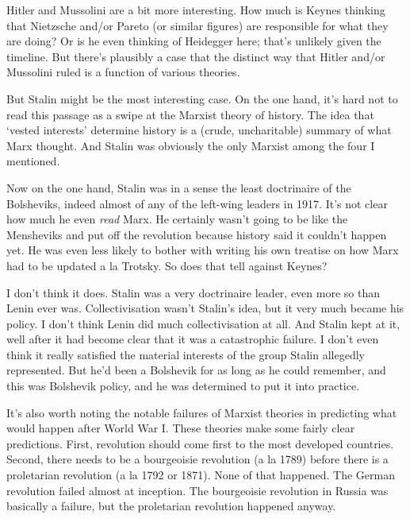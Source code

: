 \documentclass[
  11pt,
  letterpaper,
  DIV=11,
  numbers=noendperiod,
  oneside]{scrartcl}
\begin{document}
Hitler and Mussolini are a bit more interesting. How much is Keynes
thinking that Nietzsche and/or Pareto (or similar figures) are
responsible for what they are doing? Or is he even thinking of Heidegger
here; that's unlikely given the timeline. But there's plausibly a case
that the distinct way that Hitler and/or Mussolini ruled is a function
of various theories.

But Stalin might be the most interesting case. On the one hand, it's
hard not to read this passage as a swipe at the Marxist theory of
history. The idea that `vested interests' determine history is a (crude,
uncharitable) summary of what Marx thought. And Stalin was obviously the
only Marxist among the four I mentioned.

Now on the one hand, Stalin was in a sense the least doctrinaire of the
Bolsheviks, indeed almost of any of the left-wing leaders in 1917. It's
not clear how much he even \emph{read} Marx. He certainly wasn't going
to be like the Mensheviks and put off the revolution because history
said it couldn't happen yet. He was even less likely to bother with
writing his own treatise on how Marx had to be updated a la Trotsky. So
does that tell against Keynes?

I don't think it does. Stalin was a very doctrinaire leader, even more
so than Lenin ever was. Collectivisation wasn't Stalin's idea, but it
very much became his policy. I don't think Lenin did much
collectivisation at all. And Stalin kept at it, well after it had become
clear that it was a catastrophic failure. I don't even think it really
satisfied the material interests of the group Stalin allegedly
represented. But he'd been a Bolshevik for as long as he could remember,
and this was Bolshevik policy, and he was determined to put it into
practice.

It's also worth noting the notable failures of Marxist theories in
predicting what would happen after World War I. These theories make some
fairly clear predictions. First, revolution should come first to the
most developed countries. Second, there needs to be a bourgeoisie
revolution (a la 1789) before there is a proletarian revolution (a la
1792 or 1871). None of that happened. The German revolution failed
almost at inception. The bourgeoisie revolution in Russia was basically
a failure, but the proletarian revolution happened anyway.
\end{document}
